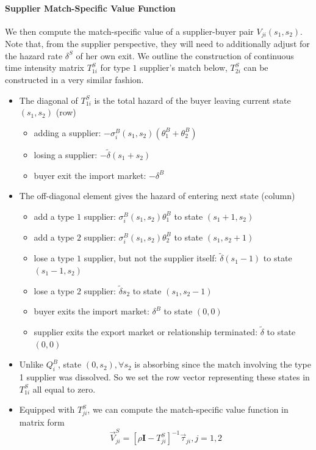 \documentclass[12pt]{article} \usepackage{amsmath,amssymb,amsthm,geometry,graphicx,setspace,algorithm,algpseudocode,float}
\begin{document}
\paragraph{Supplier Match-Specific Value Function}
 We then compute the match-specific value of a supplier-buyer pair $V_{ji}(s_1,s_2)$.  Note that, from the supplier perspective, they will need to additionally adjust for the hazard rate $\delta^S$ of her own exit. We outline the construction of continuous time intensity matrix $T_{1i}^S$ for type $1$ supplier's match below, $T_{2i}^S$ can be constructed in a very similar fashion.
\begin{itemize}
\item The diagonal of $T_{1i}^S$ is the total hazard of the buyer leaving current state $(s_1,s_2)$ (row)
\begin{itemize}
\item adding a supplier: $-\sigma^B_i(s_1,s_2)(\theta_1^B+\theta_2^B)$
\item losing a supplier: $-\tilde{\delta}(s_1+s_2)$
\item buyer exit the import market: $-\delta^B$
\end{itemize}
\item The off-diagonal element gives the hazard of entering next state (column)
\begin{itemize}
\item add a type $1$ supplier: $\sigma^B_i(s_1,s_2)\theta_1^B$ to state $(s_1+1,s_2)$  
\item add a type $2$ supplier: $\sigma^B_i(s_1,s_2)\theta_2^B$ to state $(s_1,s_2+1)$ 
\item lose a type $1$ supplier, but not the supplier itself: $\tilde{\delta}(s_1-1)$ to state $(s_1-1,s_2)$
\item lose a type $2$ supplier: $\tilde{\delta}s_2$ to state $(s_1,s_2-1)$ 
\item buyer exits the import market: $\delta^B$ to state $(0,0)$
\item supplier exits the export market or relationship terminated: $\tilde{\delta}$ to state $(0,0)$
\end{itemize}
\item Unlike $Q^B_i$, state $(0,s_2), \forall s_2$ is absorbing since the match involving the type 1 supplier was dissolved. So we set the row vector representing these states in $T_{1i}^S$ all equal to zero. 
\item Equipped with $T_{ji}^S$, we can compute the match-specific value function in matrix form
\[
  \vec{V}_{ji}^S = [\rho \mathbf{I} - T^S_{ji}]^{-1} \vec{\tau}_{ji}, j = 1,2
\]
\end{itemize}
\end{document}
